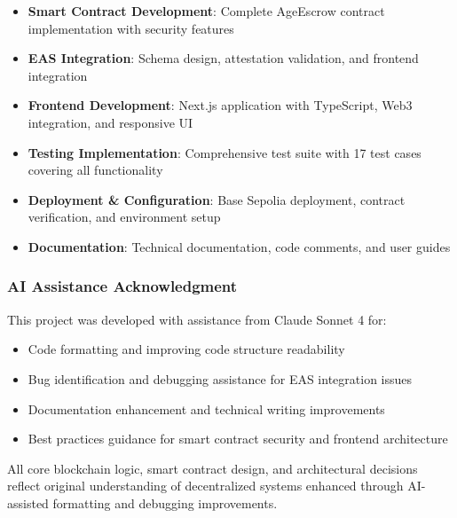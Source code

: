\documentclass[12pt,a4paper]{article}
\begin{document}
\begin{itemize}
    \item \textbf{Smart Contract Development}: Complete AgeEscrow contract implementation with security features
    \item \textbf{EAS Integration}: Schema design, attestation validation, and frontend integration
    \item \textbf{Frontend Development}: Next.js application with TypeScript, Web3 integration, and responsive UI
    \item \textbf{Testing Implementation}: Comprehensive test suite with 17 test cases covering all functionality
    \item \textbf{Deployment \& Configuration}: Base Sepolia deployment, contract verification, and environment setup
    \item \textbf{Documentation}: Technical documentation, code comments, and user guides
\end{itemize}

\subsubsection{AI Assistance Acknowledgment}
This project was developed with assistance from Claude Sonnet 4 for:
\begin{itemize}
    \item Code formatting and improving code structure readability
    \item Bug identification and debugging assistance for EAS integration issues
    \item Documentation enhancement and technical writing improvements
    \item Best practices guidance for smart contract security and frontend architecture
\end{itemize}

All core blockchain logic, smart contract design, and architectural decisions reflect original understanding of decentralized systems enhanced through AI-assisted formatting and debugging improvements.
\end{document}
